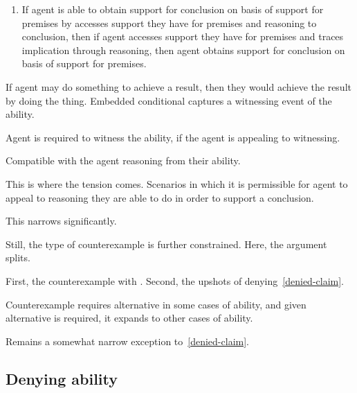 \begin{enumerate}[]
\item\label{access:exception} If agent is able to obtain support for conclusion on basis of support for premises by accesses support they have for premises and reasoning to conclusion, then if agent accesses support they have for premises and traces implication through reasoning, then agent obtains support for conclusion on basis of support for premises.
\end{enumerate}

If agent may do something to achieve a result, then they would achieve the result by doing the thing.
Embedded conditional captures a witnessing event of the ability.

Agent is required to witness the ability, if the agent is appealing to witnessing.

Compatible with the agent reasoning from their ability.

This is where the tension comes.
Scenarios in which it is permissible for agent to appeal to reasoning they are able to do in order to support a conclusion.

This narrows significantly.

Still, the type of counterexample is further constrained.
Here, the argument splits.

First, the counterexample with \nI{}.
Second, the upshots of denying~\ref{denied-claim}.

Counterexample requires alternative in some cases of ability, and given alternative is required, it expands to other cases of ability.

Remains a somewhat narrow exception to~\ref{denied-claim}.



\subsection{Denying ability}
\label{sec:denying-ability}

